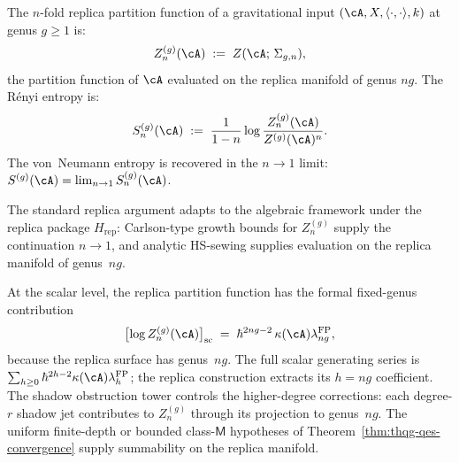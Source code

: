\begin{conjecture}
\label{conj:thqg-replica}
The $n$-fold replica partition function of a gravitational input
$(\cA, X, \langle \cdot, \cdot \rangle, k)$ at genus $g \ge 1$
is:
\begin{equation}\label{eq:thqg-replica-pf}
Z_n^{(g)}(\cA)
\;:=\;
Z(\cA;\, \Sigma_{g,n}),
\end{equation}
the partition function of $\cA$ evaluated on the replica manifold
of genus $ng$. The R\'enyi entropy is:
\begin{equation}\label{eq:thqg-renyi}
S_n^{(g)}(\cA)
\;:=\;
\frac{1}{1-n}
\log\frac{Z_n^{(g)}(\cA)}{Z^{(g)}(\cA)^n}.
\end{equation}
The von~Neumann entropy is recovered in the $n \to 1$ limit:
$S^{(g)}(\cA) = \lim_{n \to 1} S_n^{(g)}(\cA)$.
\end{conjecture}

\begin{remark}
The standard replica argument
\cite{Calabrese-Cardy04,Lewkowycz-Maldacena13} adapts to the
algebraic framework under the replica package $H_{\mathrm{rep}}$:
Carlson-type growth bounds for $Z_n^{(g)}$ supply the continuation
$n\to1$, and analytic HS-sewing supplies evaluation on the replica
manifold of genus~$ng$.
\end{remark}

\begin{remark}
\label{rem:thqg-shadow-on-replica}
At the scalar level, the replica partition function has the formal
fixed-genus contribution
\[
\bigl[\log Z_n^{(g)}(\cA)\bigr]_{\mathrm{sc}}
\;=\;
\hbar^{2ng-2}\,\kappa(\cA)\lambda_{ng}^{\mathrm{FP}},
\]
because the replica surface has genus~$ng$.  The full scalar
generating series is
$\sum_{h\ge0}\hbar^{2h-2}\kappa(\cA)\lambda_h^{\mathrm{FP}}$; the
replica construction extracts its $h=ng$ coefficient.
The shadow obstruction tower controls the higher-degree corrections:
each degree-$r$ shadow jet contributes to $Z_n^{(g)}$
through its projection to genus~$ng$.  The uniform finite-depth or
bounded class-$\mathsf M$ hypotheses of
Theorem~\ref{thm:thqg-qes-convergence} supply summability on the
replica manifold.
\end{remark}

%
%

